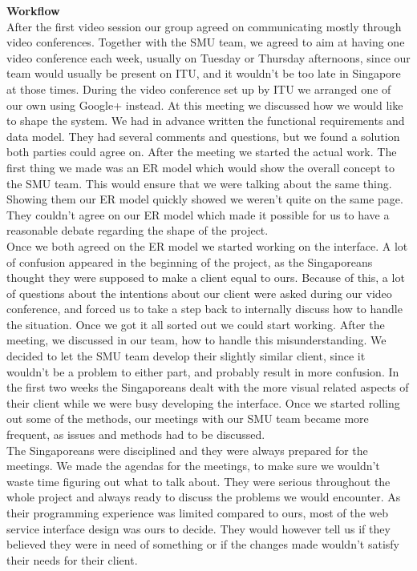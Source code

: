 \documentclass[10pt,a4paper]{article}
\begin{document}
{\bfseries Workflow}\\
After the first video session our group agreed on communicating mostly through video conferences. Together with the SMU team, we agreed to aim at having one video conference each week, usually on Tuesday or Thursday afternoons, since our team would usually be present on ITU, and it wouldn’t be too late in Singapore at those times.
During the video conference set up by ITU we arranged one of our own using Google+ instead. At this meeting we discussed how we would like to shape the system. We had in advance written the functional requirements and data model. They had several comments and questions, but we found a solution both parties could agree on. After the meeting we started the actual work. The first thing we made was an ER model which would show the overall concept to the SMU team. This would ensure that we were talking about the same thing. Showing them our ER model quickly showed we weren’t quite on the same page. They couldn’t agree on our ER model which made it possible for us to have a reasonable debate regarding the shape of the project.\\
Once we both agreed on the ER model we started working on the interface. A lot of confusion appeared in the beginning of the project, as the Singaporeans thought they were supposed to make a client equal to ours. Because of this, a lot of questions about the intentions about our client  were asked during our video conference, and forced us to take a step back to internally discuss how to handle the situation. Once we got it all sorted out we could start working. After the meeting, we discussed in our team, how to handle this misunderstanding. We decided to let the SMU team develop their slightly similar client, since it wouldn’t be a problem to either part, and probably result in more confusion. In the first two weeks the Singaporeans dealt with the more visual related aspects of their client while we were busy developing the interface. Once we started rolling out some of the methods, our meetings with our SMU team became more frequent, as issues and methods had to be discussed.\\
The Singaporeans were disciplined and they were always prepared for the meetings. We made the agendas for the meetings, to make sure we wouldn’t waste time figuring out what to talk about. They were serious throughout the whole project and always ready to discuss the problems we would encounter. As their programming experience was limited compared to ours, most of the web service interface design was ours to decide. They would however tell us if they believed they were in need of something or if the changes made wouldn’t satisfy their needs for their client.\\\\
\end{document}
